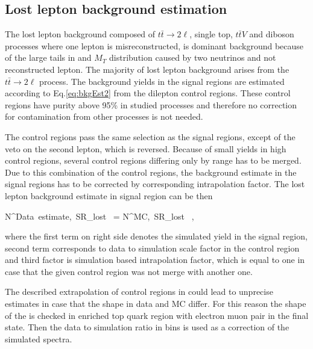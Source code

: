 \subsection{Lost lepton background estimation}

The lost lepton background composed of $t\bar{t} \to 2\ell$, single top, $t\bar{t}V$ and diboson processes where one lepton is misreconstructed, is dominant background because of the large tails in \MET and $M_{T}$ distribution caused by two neutrinos and not reconstructed lepton. The majority of lost lepton background arises from the $t\bar{t} \to 2\ell$ process. The background yields in the signal regions are  estimated according to Eq.\ref{eq:bkgEst2} from the dilepton control regions. These control regions have purity above 95\% in studied processes and therefore no correction for contamination from other processes is not needed. 

The control regions pass the same selection as the signal regions, except of the veto on the second lepton, which is reversed. Because of small yields in high \MET control regions, several control regions differing only by \MET range has to be merged. Due to this combination of the control regions, the background estimate in the signal regions has to be corrected by corresponding intrapolation factor. The lost lepton background estimate in signal region can be then 

{
N^{Data~estimate,~SR}_{lost~\ell}  = N^{MC,~SR}_{lost~\ell} \times  {} \times {},
}

where the first term on right side denotes the simulated yield in the signal region, second term corresponds to data to simulation scale factor in the control region and third factor is simulation based intrapolation factor, which is equal to one in case that the given control region was not merge with another one.

The described extrapolation of control regions in \MET could lead to unprecise estimates in case that the \MET shape in data and MC differ. For this reason the shape of the \MET is checked in enriched top quark region with electron muon pair in the final state. Then the data to simulation ratio in \MET bins is used as a correction of the simulated \MET spectra. 


